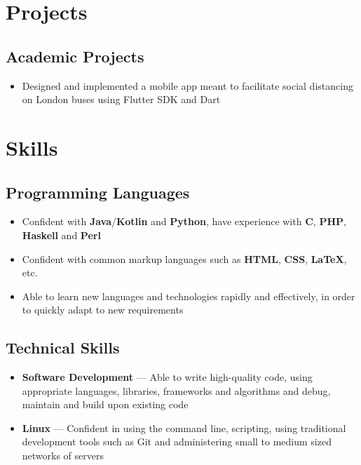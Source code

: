 \documentclass[a4paper]{article}
\begin{document}
\section*{Projects}

\subsection*{Academic Projects}
\begin{itemize}
	\item Designed and implemented a mobile app meant to facilitate social distancing on London buses using Flutter SDK and Dart
\end{itemize}

\section*{Skills}

\subsection*{Programming Languages}
\begin{itemize}
	\item Confident with \textbf{Java}/\textbf{Kotlin} and \textbf{Python}, have experience with \textbf{C},
	      \textbf{PHP}, \textbf{Haskell} and \textbf{Perl}
	\item Confident with common markup languages such as \textbf{HTML},
	      \textbf{CSS}, \textbf{{\LaTeX}}, etc.
	\item Able to learn new languages and technologies rapidly and effectively,
	      in order to quickly adapt to new requirements
\end{itemize}

\subsection*{Technical Skills}
\begin{itemize}
	\item \textbf{Software Development} --- Able to write high-quality code, using
	      appropriate languages, libraries, frameworks and algorithms and debug,
	      maintain and build upon existing code
	\item \textbf{Linux} --- Confident in using the command line, scripting, using
	      traditional development tools such as Git and administering small to
	      medium sized networks of servers
\end{itemize}
\end{document}

